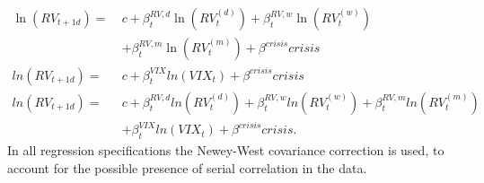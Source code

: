 \begin{align}
\ln(RV_{t+1d}) = \ &c + \beta^{RV,d}_{t} \ln(RV^{(d)}_{t}) + \beta^{RV,w}_{t} \ln(RV^{(w)}_{t}) \nonumber \\
& + \beta^{RV,m}_{t} \ln(RV^{(m)}_{t}) + \beta^{crisis} crisis  \tag{Reg1b}  \label{eq:Reg1b}\\
ln(RV_{t+1d}) =  \ &c + \beta^{VIX}_{t} ln(VIX_{t}) + \beta^{crisis} crisis  \tag{Reg2b}  \label{eq:Reg2b}\\
ln(RV_{t+1d}) = \ &c + \beta^{RV,d}_{t} ln(RV^{(d)}_{t}) + \beta^{RV,w}_{t} ln(RV^{(w)}_{t}) + \beta^{RV,m}_{t} ln(RV^{(m)}_{t}) \nonumber \\
& + \beta^{VIX}_{t} ln(VIX_{t})+ \beta^{crisis} crisis.  \tag{Reg3b}  \label{eq:Reg3b}
\end{align}
In all regression specifications the Newey-West covariance correction is used, to account for the possible presence of serial correlation in the data.


